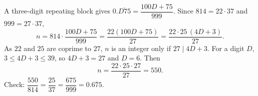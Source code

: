 A three-digit repeating block gives $0.\overline{D75}=\dfrac{100D+75}{999}$. Since $814=22\cdot37$ and $999=27\cdot37$,
\[
n=814\cdot\dfrac{100D+75}{999}=\dfrac{22(100D+75)}{27}=\dfrac{22\cdot25\,(4D+3)}{27}.
\]
As $22$ and $25$ are coprime to $27$, $n$ is an integer only if $27\mid 4D+3$. For a digit $D$, $3\le4D+3\le39$, so $4D+3=27$ and $D=6$. Then
\[
n=\dfrac{22\cdot25\cdot27}{27}=\boxed{550}.
\]
Check: $\dfrac{550}{814}=\dfrac{25}{37}=\dfrac{675}{999}=0.\overline{675}$.
